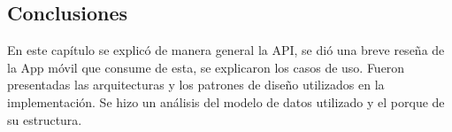 \subsection{Conclusiones}
En este capítulo se explicó de manera general la API, se dió una breve reseña de la App móvil que consume de esta, se explicaron los casos de uso. Fueron presentadas las arquitecturas y los patrones de diseño utilizados en la implementación. Se hizo un análisis del modelo de datos utilizado  y el porque de su estructura.

  

